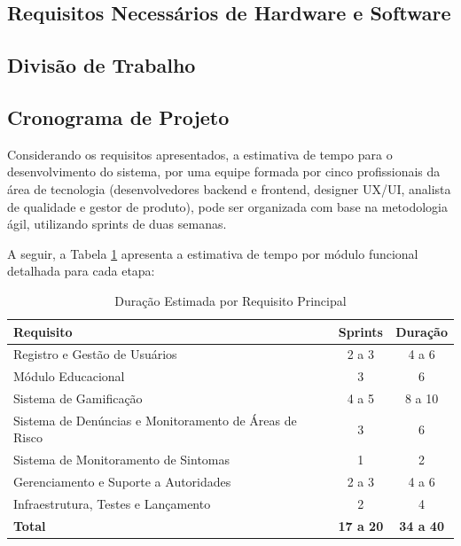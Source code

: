 \documentclass[a4paper, 12pt]{article}
\begin{document}
\subsection{Requisitos Necessários de Hardware e Software}

\subsection{Divisão de Trabalho}

\subsection{Cronograma de Projeto}

Considerando os requisitos apresentados, a estimativa de tempo para o desenvolvimento do sistema, por uma equipe formada por cinco profissionais da área de tecnologia (desenvolvedores backend e frontend, designer UX/UI, analista de qualidade e gestor de produto), pode ser organizada com base na metodologia ágil, utilizando sprints de duas semanas.

A seguir, a Tabela \ref{tab:cronograma}  apresenta a estimativa de tempo por módulo funcional detalhada para cada etapa:

\begin{table}[h]
\centering
\caption{Duração Estimada por Requisito Principal}
\label{tab:cronograma}
\begin{tabular}{|l|c|c|}
\hline
\textbf{Requisito} & \textbf{Sprints} & \textbf{Duração} \\
\hline
Registro e Gestão de Usuários & 2 a 3 & 4 a 6 \\
Módulo Educacional & 3  & 6 \\
Sistema de Gamificação & 4 a 5  & 8 a 10 \\
Sistema de Denúncias e Monitoramento de Áreas de Risco & 3  & 6  \\
Sistema de Monitoramento de Sintomas & 1  & 2  \\
Gerenciamento e Suporte a Autoridades & 2 a 3  & 4 a 6  \\
Infraestrutura, Testes e Lançamento & 2  & 4 \\
\hline
\textbf{Total} & \textbf{17 a 20} & \textbf{34 a 40} \\
\hline
\end{tabular}
\end{table}
\end{document}
